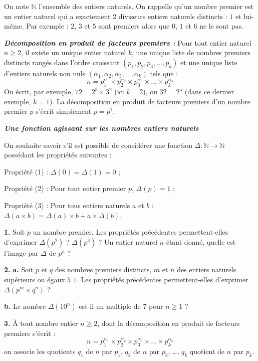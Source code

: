 On note $\mathbb{N}$ l'ensemble des entiers naturels. On rappelle qu'un nombre premier est un entier naturel qui a
exactement $2$ diviseurs entiers naturels distincts : $1$ et lui-même. Par exemple : $2$, $3$ et $5$ sont premiers alors que $0$,
$1$ et $6$ ne le sont pas.

\textbf{\emph{Décomposition en produit de facteurs premiers :}}
Pour tout entier naturel $n \geqslant 2$, il existe un unique entier naturel $k$, une unique liste de nombres premiers distincts
rangés dans l'ordre croissant $(p_1, p_2, p_3, \ldots, p_k)$ et une unique liste d'entiers naturels non nuls $(\alpha_1, \alpha_2, \alpha_3, \ldots, \alpha_k)$
tels que :
\[
n = p_1^{\alpha_1} \times p_2^{\alpha_2} \times p_3^{\alpha_3} \times \ldots \times p_k^{\alpha_k}
\]
On écrit, par exemple, $72 = 2^3 \times 3^2$ (ici $k = 2$), ou $32 = 2^5$ (dans ce dernier exemple, $k = 1$). La décomposition
en produit de facteurs premiers d'un nombre premier $p$ s'écrit simplement $p = p^1$.

\textbf{\emph{Une fonction agissant sur les nombres entiers naturels}}

On souhaite savoir s'il est possible de considérer une fonction $\Delta \colon \mathbb{N} \to \mathbb{N}$ possédant les propriétés suivantes :

Propriété (1) : $\Delta(0) = \Delta(1) = 0$ ;

Propriété (2) : Pour tout entier premier $p$, $\Delta(p) = 1$ ;

Propriété (3) : Pour tous entiers naturels $a$ et $b$ : $\Delta(a \times b) = \Delta(a) \times b + a \times \Delta(b)$.

\textbf{1.} Soit $p$ un nombre premier. Les propriétés précédentes permettent-elles d'exprimer $\Delta(p^2)$ ? $\Delta(p^3)$ ? Un entier
naturel $n$ étant donné, quelle est l'image par $\Delta$ de $p^n$ ?

\textbf{2.} \textbf{a.} Soit $p$ et $q$ des nombres premiers distincts, $m$ et $n$ des entiers naturels supérieurs ou égaux à $1$. Les
propriétés précédentes permettent-elles d'exprimer $\Delta(p^m \times q^n)$ ?

\textbf{b.} Le nombre $\Delta(10^n)$ est-il un multiple de $7$ pour $n \geqslant 1$ ?

\textbf{3.} À tout nombre entier $n \geqslant 2$, dont la décomposition en produit de facteurs premiers s'écrit :
\[
n = p_1^{\alpha_1} \times p_2^{\alpha_2} \times p_3^{\alpha_3} \times \ldots \times p_k^{\alpha_k}
\]
on associe les quotients $q_1$ de $n$ par $p_1$, $q_2$ de $n$ par $p_2$, \ldots, $q_k$ quotient de $n$ par $p_k$.

